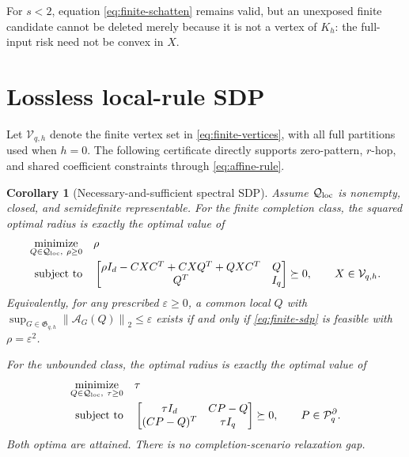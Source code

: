 \documentclass[11pt]{article}
\newtheorem{corollary}[theorem]{Corollary}
\theoremstyle{definition}
\theoremstyle{remark}
\newcommand{\cP}{\mathcal P}
\newcommand{\cQ}{\mathcal Q}
\newcommand{\cA}{\mathcal A}
\newcommand{\fG}{\mathfrak G}
\newcommand{\norm}[1]{\left\lVert #1\right\rVert}
\begin{document}
For $s<2$, equation \eqref{eq:finite-schatten} remains valid, but an
unexposed finite candidate cannot be deleted merely because it is not a
vertex of $K_h$: the full-input risk need not be convex in $X$.

\section{Lossless local-rule SDP}

Let $\mathcal V_{q,h}$ denote the finite vertex set in
\eqref{eq:finite-vertices}, with all full partitions used when $h=0$.  The
following certificate directly supports zero-pattern, $r$-hop, and shared
coefficient constraints through \eqref{eq:affine-rule}.

\begin{corollary}[Necessary-and-sufficient spectral SDP]
\label{cor:sdp}
Assume $\cQ_{\rm loc}$ is nonempty, closed, and semidefinite representable.
For the finite completion class, the squared optimal radius is exactly the
optimal value of
\begin{equation}
\begin{aligned}
 \underset{Q\in\cQ_{\rm loc},\ \rho\geq0}{\operatorname{minimize}}
 &\quad \rho\\
 \text{subject to}
 &\quad
 \begin{bmatrix}
  \rho I_d-CXC^T+CXQ^T+QXC^T & Q\\
  Q^T&I_q
 \end{bmatrix}\succeq0,
 \qquad X\in\mathcal V_{q,h}.
\end{aligned}
\label{eq:finite-sdp}
\end{equation}
Equivalently, for any prescribed $\varepsilon\geq0$, a common local $Q$ with
$\sup_{G\in\fG_{q,h}}\norm{\cA_G(Q)}_2\leq\varepsilon$ exists if and only if
\eqref{eq:finite-sdp} is feasible with $\rho=\varepsilon^2$.

For the unbounded class, the optimal radius is exactly the optimal value of
\begin{equation}
\begin{aligned}
 \underset{Q\in\cQ_{\rm loc},\ \tau\geq0}{\operatorname{minimize}}
 &\quad \tau\\
 \text{subject to}
 &\quad
 \begin{bmatrix}
  \tau I_d&CP-Q\\
  (CP-Q)^T&\tau I_q
 \end{bmatrix}\succeq0,
 \qquad P\in\cP_q^\partial.
\end{aligned}
\label{eq:unbounded-sdp}
\end{equation}
Both optima are attained.  There is no completion-scenario relaxation gap.
\end{corollary}
\end{document}
